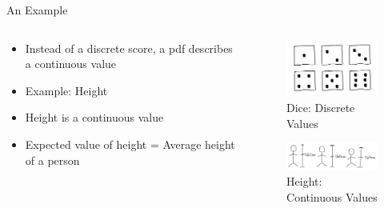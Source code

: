 \documentclass{beamer}
\begin{document}
\begin{frame}{An Example}
  \begin{columns}
    \begin{column}{0.5\textwidth}
      \begin{itemize}
      \item Instead of a discrete score, a pdf describes a continuous value
      \item Example: Height
      \item Height is a continuous value
      \item Expected value of height = Average height of a person
      \end{itemize}
    \end{column}

    \begin{column}{0.5\textwidth}
      \begin{figure}[H]
        \centering
        \includegraphics[width=3.5cm]{dice.jpg}
        \caption{Dice: Discrete Values}
      \end{figure}
      \begin{figure}[H]
        \centering
        \includegraphics[width=5.0cm]{height.jpg}
        \caption{Height: Continuous Values}
      \end{figure}
    \end{column}
  \end{columns}
\end{frame}
\end{document}
